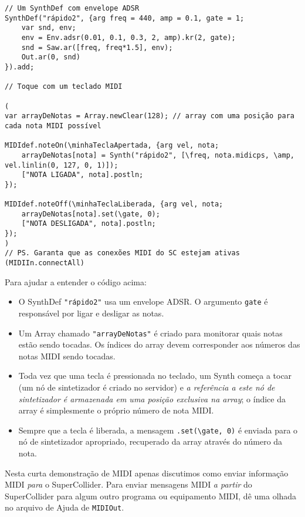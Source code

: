 \begin{lstlisting}[style=SuperCollider-IDE, basicstyle=\scttfamily\footnotesize]
 // Um SynthDef com envelope ADSR
SynthDef("rápido2", {arg freq = 440, amp = 0.1, gate = 1;
	var snd, env;
	env = Env.adsr(0.01, 0.1, 0.3, 2, amp).kr(2, gate);
	snd = Saw.ar([freq, freq*1.5], env);	
	Out.ar(0, snd)
}).add;

// Toque com um teclado MIDI

(
var arrayDeNotas = Array.newClear(128); // array com uma posição para cada nota MIDI possível

MIDIdef.noteOn(\minhaTeclaApertada, {arg vel, nota;
	arrayDeNotas[nota] = Synth("rápido2", [\freq, nota.midicps, \amp, vel.linlin(0, 127, 0, 1)]);
	["NOTA LIGADA", nota].postln;
});
	
MIDIdef.noteOff(\minhaTeclaLiberada, {arg vel, nota;
	arrayDeNotas[nota].set(\gate, 0);
	["NOTA DESLIGADA", nota].postln;
});
)
// PS. Garanta que as conexões MIDI do SC estejam ativas (MIDIIn.connectAll)
 \end{lstlisting} 
 
Para ajudar a entender o código acima:

\begin{itemize}
\item O SynthDef \texttt{"rápido2"} usa um envelope ADSR. O argumento \texttt{gate} é responsável por ligar e desligar as notas.
\item Um Array chamado \texttt{"arrayDeNotas"} é criado para monitorar quais notas estão sendo tocadas. Os índices do array devem corresponder aos números das notas MIDI sendo tocadas.
\item Toda vez que uma tecla é pressionada no teclado, um Synth começa a tocar (um nó de sintetizador é criado no servidor) e \emph{a referência a este nó de sintetizador é armazenada em uma posição exclusiva na array}; o índice da array é simplesmente o próprio número de nota MIDI.
\item Sempre que a tecla é liberada, a mensagem \texttt{.set(\textbackslash gate, 0)} é enviada para o nó de sintetizador apropriado, recuperado da array através do número da nota.
\end{itemize}

Nesta curta demonstração de MIDI apenas discutimos como enviar informação MIDI \emph{para} o SuperCollider. Para enviar mensagens MIDI \emph{a partir} do SuperCollider para algum outro programa ou equipamento MIDI, dê uma olhada no arquivo de Ajuda de \texttt{MIDIOut}.
